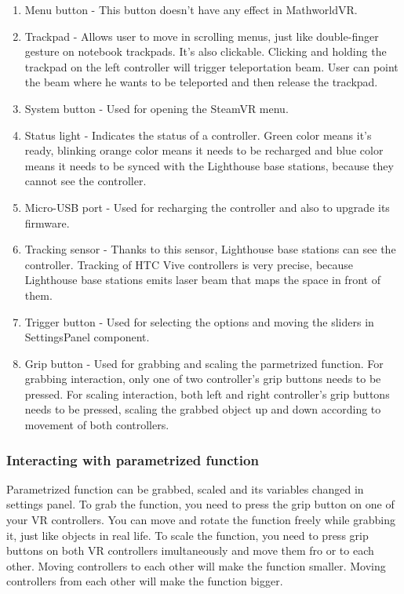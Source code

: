 \begin{enumerate}
\item{Menu button - This button doesn't have any effect in MathworldVR.}
\item{Trackpad - Allows user to move in scrolling menus, just like double-finger gesture on notebook trackpads. It's also clickable. Clicking and holding the trackpad on the left controller will trigger teleportation beam. User can point the beam where he wants to be teleported and then release the trackpad.}
\item{System button - Used for opening the SteamVR menu.}
\item{Status light - Indicates the status of a controller. Green color means it's ready, blinking orange color means it needs to be recharged and blue color means it needs to be synced with the Lighthouse base stations, because they cannot see the controller.}
\item{Micro-USB port - Used for recharging the controller and also to upgrade its firmware.}
\item{Tracking sensor - Thanks to this sensor, Lighthouse base stations can see the controller. Tracking of HTC Vive controllers is very precise, because Lighthouse base stations emits laser beam that maps the space in front of them.}
\item{Trigger button - Used for selecting the options and moving the sliders in SettingsPanel component.}
\item{Grip button - Used for grabbing and scaling the parmetrized function. For grabbing interaction, only one of two controller's grip buttons needs to be pressed. For scaling interaction, both left and right controller's grip buttons needs to be pressed, scaling the grabbed object up and down according to movement of both controllers.}
\end{enumerate}

\newpage
\subsubsection*{Interacting with parametrized function}
Parametrized function can be grabbed, scaled and its variables changed in settings panel. To grab the function, you need to press the grip button on one of your VR controllers. You can move and rotate the function freely while grabbing it, just like objects in real life. To scale the function, you need to press grip buttons on both VR controllers imultaneously and move them fro or to each other. Moving controllers to each other will make the function smaller. Moving controllers from each other will make the function bigger.


